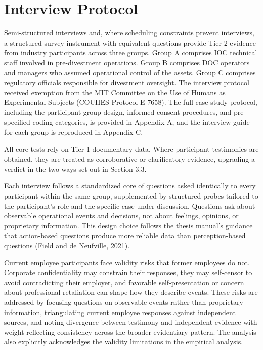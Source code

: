 \hypertarget{interview-protocol}{%
\section{Interview Protocol}\label{interview-protocol}}

Semi-structured interviews and, where scheduling constraints prevent
interviews, a structured survey instrument with equivalent questions
provide Tier 2 evidence from industry participants across three groups.
Group A comprises IOC technical staff involved in pre-divestment
operations. Group B comprises DOC operators and managers who assumed
operational control of the assets. Group C comprises regulatory
officials responsible for divestment oversight. The interview protocol
received exemption from the MIT Committee on the Use of Humans as
Experimental Subjects (COUHES Protocol E-7658). The full case study
protocol, including the participant-group design, informed-consent
procedures, and pre-specified coding categories, is provided in Appendix
A, and the interview guide for each group is reproduced in Appendix C.

All core tests rely on Tier 1 documentary data. Where participant
testimonies are obtained, they are treated as corroborative or
clarificatory evidence, upgrading a verdict in the two ways set out in
Section 3.3.

Each interview follows a standardized core of questions asked
identically to every participant within the same group, supplemented by
structured probes tailored to the participant's role and the specific
case under discussion. Questions ask about observable operational events
and decisions, not about feelings, opinions, or proprietary information.
This design choice follows the thesis manual's guidance that
action-based questions produce more reliable data than perception-based
questions (Field and de Neufville, 2021).

Current employee participants face validity risks that former employees
do not. Corporate confidentiality may constrain their responses, they
may self-censor to avoid contradicting their employer, and favorable
self-presentation or concern about professional retaliation can shape
how they describe events. These risks are addressed by focusing
questions on observable events rather than proprietary information,
triangulating current employee responses against independent sources,
and noting divergence between testimony and independent evidence with
weight reflecting consistency across the broader evidentiary pattern.
The analysis also explicitly acknowledges the validity limitations in
the empirical analysis.

